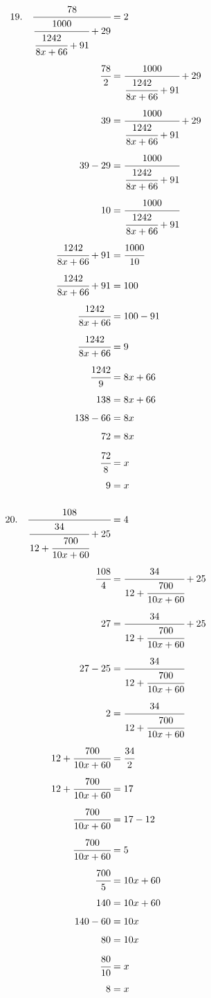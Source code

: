 \documentclass{article}
\begin{document}
\noindent
\begin{minipage}[t]{0.5000\textwidth}
\begin{align*}
19.\hspace{10pt}\cfrac{78}{\cfrac{1000}{\cfrac{1242}{8x+66}+91}+29}&=2\\[4pt]
\cfrac{78}{2}&=\cfrac{1000}{\cfrac{1242}{8x+66}+91}+29\\[4pt]
39&=\cfrac{1000}{\cfrac{1242}{8x+66}+91}+29\\[4pt]
39-29&=\cfrac{1000}{\cfrac{1242}{8x+66}+91}\\[4pt]
10&=\cfrac{1000}{\cfrac{1242}{8x+66}+91}\\[4pt]
\cfrac{1242}{8x+66}+91&=\cfrac{1000}{10}\\[4pt]
\cfrac{1242}{8x+66}+91&=100\\[4pt]
\cfrac{1242}{8x+66}&=100-91\\[4pt]
\cfrac{1242}{8x+66}&=9\\[4pt]
\cfrac{1242}{9}&=8x+66\\[4pt]
138&=8x+66\\[4pt]
138-66&=8x\\[4pt]
72&=8x\\[4pt]
\cfrac{72}{8}&=x\\[4pt]
9&=x\\[4pt]
\end{align*}
\end{minipage}
\begin{minipage}[t]{0.5000\textwidth}
\begin{align*}
20.\hspace{10pt}\cfrac{108}{\cfrac{34}{12+\cfrac{700}{10x+60}}+25}&=4\\[4pt]
\cfrac{108}{4}&=\cfrac{34}{12+\cfrac{700}{10x+60}}+25\\[4pt]
27&=\cfrac{34}{12+\cfrac{700}{10x+60}}+25\\[4pt]
27-25&=\cfrac{34}{12+\cfrac{700}{10x+60}}\\[4pt]
2&=\cfrac{34}{12+\cfrac{700}{10x+60}}\\[4pt]
12+\cfrac{700}{10x+60}&=\cfrac{34}{2}\\[4pt]
12+\cfrac{700}{10x+60}&=17\\[4pt]
\cfrac{700}{10x+60}&=17-12\\[4pt]
\cfrac{700}{10x+60}&=5\\[4pt]
\cfrac{700}{5}&=10x+60\\[4pt]
140&=10x+60\\[4pt]
140-60&=10x\\[4pt]
80&=10x\\[4pt]
\cfrac{80}{10}&=x\\[4pt]
8&=x\\[4pt]
\end{align*}
\end{minipage}
\end{document}
